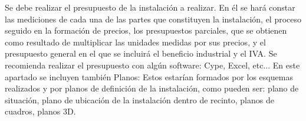 \clearpage
{}
Se debe realizar el presupuesto de la instalación a realizar. En él se hará constar las mediciones de
cada una de las partes que constituyen la instalación, el proceso seguido en la formación de
precios, los presupuestos parciales, que se obtienen como resultado de multiplicar las unidades
medidas por sus precios, y el presupuesto general en el que se incluirá el beneficio industrial y el IVA.
Se recomienda realizar el presupuesto con algún software: Cype, Excel, etc...
En este apartado se incluyen también Planos: Estos estarían formados por los esquemas
realizados y por planos de definición de la instalación, como pueden ser: plano de situación, plano
de ubicación de la instalación dentro de recinto, planos de cuadros, planos 3D.

